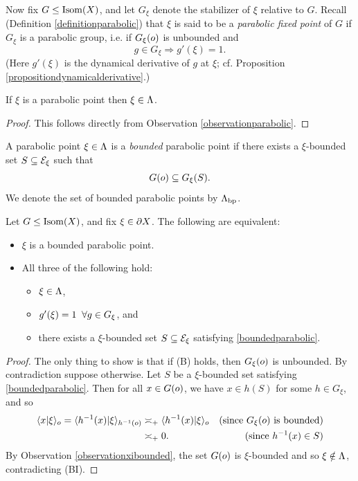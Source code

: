 Now fix $G\leq\operatorname{Isom}(X)$, and let $G_\xi$ denote the stabilizer of $\xi$ relative to $G$. Recall (Definition \ref{definitionparabolic}) that $\xi$ is said to be a \emph{parabolic fixed point} of $G$ if $G_\xi$ is a parabolic group, i.e. if $G_\xi(o)$ is unbounded and
\[
g\in G_\xi \Rightarrow g'(\xi) = 1.
\]
(Here $g'(\xi)$ is the dynamical derivative of $g$ at $\xi$; cf. Proposition \ref{propositiondynamicalderivative}.)

\begin{observation}
If $\xi$ is a parabolic point then $\xi\in\Lambda$.
\end{observation}
\begin{proof}
This follows directly from Observation \ref{observationparabolic}.
\end{proof}

\begin{definition}
\label{definitionboundedparabolic}
A parabolic point $\xi\in\Lambda$ is a \emph{bounded} parabolic point if there exists a $\xi$-bounded set $S\subseteq\mathcal E_\xi$ such that
\begin{equation}
\label{boundedparabolic}
G(o) \subseteq G_\xi(S).
\end{equation}
We denote the set of bounded parabolic points by $\Lambda_{\mathrm{bp}}$.
\end{definition}

\begin{lemma}
Let $G\leq\operatorname{Isom}(X)$, and fix $\xi\in\partial X$. The following are equivalent:
\begin{itemize}
\item[(A)] $\xi$ is a bounded parabolic point.
\item[(B)] All three of the following hold:
\begin{itemize}
\item[(BI)] $\xi\in\Lambda$, 
\item[(BII)] $g'(\xi) = 1 \;\;\forall g\in G_\xi$, and
\item[(BIII)] there exists a $\xi$-bounded set $S\subseteq \mathcal E_\xi$ satisfying \eqref{boundedparabolic}.
\end{itemize}
\end{itemize}
\end{lemma}
\begin{proof}
The only thing to show is that if (B) holds, then $G_\xi(o)$ is unbounded. By contradiction suppose otherwise. Let $S$ be a $\xi$-bounded set satisfying \eqref{boundedparabolic}. Then for all $x\in G(o)$, we have $x\in h(S)$ for some $h\in G_\xi$, and so
\begin{align*}
\langle x|\xi\rangle_o = \langle h^{-1}(x)|\xi\rangle_{h^{-1}(o)} &\asymp_+ \langle h^{-1}(x)|\xi\rangle_o & \textup{(since $G_\xi(o)$ is bounded)}\\
&\asymp_+ 0. & \textup{(since $h^{-1}(x)\in S$)}
\end{align*}
By Observation \ref{observationxibounded}, the set $G(o)$ is $\xi$-bounded and so $\xi\notin\Lambda$, contradicting (BI).
\end{proof}

